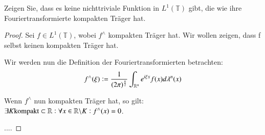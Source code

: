 
\begin{exercise}
	Zeigen Sie, dass es keine nichttriviale Funktion in $L^1(\mathbb{T})$ gibt, die wie ihre Fouriertransformierte kompakten Träger hat.
\end{exercise}

\begin{proof}
	Sei $f \in L^1 (\mathbb{T} )$, wobei $f^\wedge $ kompakten Träger hat. Wir wollen zeigen, dass f selbst keinen kompakten Träger hat.
	
	Wir werden nun die Definition der Fouriertransformierten betrachten:
	\begin{equation*}
	f^\wedge(\xi) := \frac{1}{(2\pi)^{\frac{n}{2}}} \int_{\mathbb{R}^n} e^{i\xi x} f(x) d\lambda^n(x)
	\end{equation*}
	
	Wenn $f^\wedge$ nun kompakten Träger hat, so gilt: $\exists K  \text{kompakt} \subset \mathbb{R} : \forall x \in \mathbb{R} \backslash K : f^\wedge(x) = 0$.
	
	....
	
\end{proof}
